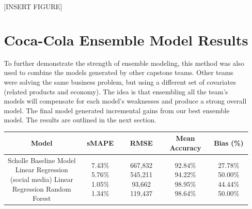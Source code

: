 \documentclass[12pt,oneside]{chicagocapstone}
\begin{document}
{[}INSERT FIGURE{]}

\section*{Coca-Cola Ensemble Model
Results}\label{coca-cola-ensemble-model-results}

To further demonstrate the strength of ensemble modeling, this method
was also used to combine the models generated by other capstone teams.
Other teams were solving the same business problem, but using a
different set of covariates (related products and economy). The idea is
that ensembling all the team's models will compensate for each model's
weaknesses and produce a strong overall model. The final model generated
incremental gains from our best ensemble model. The results are outlined
in the next section.
\begin{longtable}[]{@{}ccccc@{}}
\toprule
\begin{minipage}[b]{0.27\columnwidth}\centering\strut
Model\strut
\end{minipage} & \begin{minipage}[b]{0.13\columnwidth}\centering\strut
sMAPE\strut
\end{minipage} & \begin{minipage}[b]{0.14\columnwidth}\centering\strut
RMSE\strut
\end{minipage} & \begin{minipage}[b]{0.16\columnwidth}\centering\strut
Mean Accuracy\strut
\end{minipage} & \begin{minipage}[b]{0.16\columnwidth}\centering\strut
Bias (\%)\strut
\end{minipage}\tabularnewline
\midrule
\endhead
\begin{minipage}[t]{0.27\columnwidth}\centering\strut
Scholle Baseline Model Linear Regression (social media) Linear
Regression Random Forest\strut
\end{minipage} & \begin{minipage}[t]{0.13\columnwidth}\centering\strut
7.43\% 5.76\% 1.05\% 1.34\%\strut
\end{minipage} & \begin{minipage}[t]{0.14\columnwidth}\centering\strut
667,832 545,211 93,662 119,437\strut
\end{minipage} & \begin{minipage}[t]{0.16\columnwidth}\centering\strut
92.84\% 94.22\% 98.95\% 98.64\%\strut
\end{minipage} & \begin{minipage}[t]{0.16\columnwidth}\centering\strut
27.78\% 50.00\% 44.44\% 50.00\%\strut
\end{minipage}\tabularnewline
\bottomrule
\end{longtable}
\end{document}
